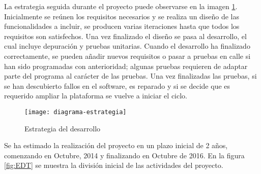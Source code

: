La estrategia seguida durante el proyecto puede observarse en la imagen \ref{fig:estrategia}.
Inicialmente se reúnen los requisitos necesarios y se realiza un diseño de las funcionalidades
a incluir, se producen varias iteraciones hasta que todos los requisitos son satisfechos. Una
vez finalizado el diseño se pasa al desarrollo, el cual incluye depuración y pruebas unitarias.
Cuando el desarrollo ha finalizado correctamente, se pueden añadir nuevos requisitos o pasar
a pruebas en calle si han sido programadas con anterioridad; algunas pruebas requieren de
adaptar parte del programa al carácter de las pruebas. Una vez finalizadas las pruebas, si se
han descubierto fallos en el software, es reparado y si se decide que es requerido ampliar
la plataforma se vuelve a iniciar el ciclo.
\begin{figure}[t]
	\begin{center}
		\texttt{[image: diagrama-estrategia]}
		\caption{Estrategia del desarrollo}
		\label{fig:estrategia}
	\end{center}
\end{figure}

Se ha estimado la realización del proyecto en un plazo inicial de 2 años, comenzando en Octubre, 2014 y
finalizando en Octubre de 2016. En la figura \ref{fig:EDT} se muestra la división inicial de las actividades
del proyecto.
\FloatBarrier
